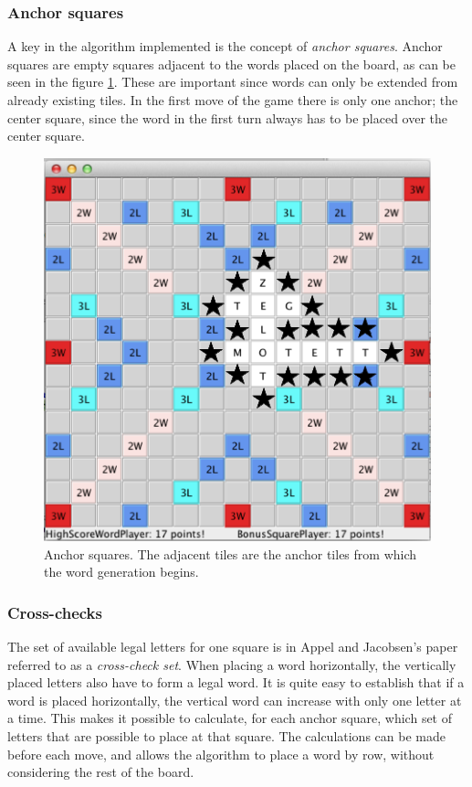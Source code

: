 \documentclass[a4paper, 12pt]{report}
\begin{document}
\subsubsection{Anchor squares}
\label{sec:anchors}
A key in the algorithm implemented is the concept of \emph{anchor squares}. Anchor squares are empty squares adjacent to the words placed on the board, as can be seen in the figure \ref{fig:anchors}. These are important since words can only be extended from already existing tiles. In the first move of the game there is only one anchor; the center square, since the word in the first turn always has to be placed over the center square.

\begin{figure}[h]
\centering
\includegraphics[scale=0.3]{anchors}
\caption{Anchor squares. The adjacent tiles are the anchor tiles from which the word generation begins.}
\label{fig:anchors}
\end{figure}

\subsubsection{Cross-checks}
\label{sec:crosscheck}
The set of available legal letters for one square is in Appel and Jacobsen's paper \cite{fastest} referred to as a \emph{cross-check set}. When placing a word horizontally, the vertically placed letters also have to form a legal word. It is quite easy to establish that if a word is placed horizontally, the vertical word can increase with only one letter at a time. This makes it possible to calculate, for each anchor square, which set of letters that are possible to place at that square. The calculations can be made before each move, and allows the algorithm to place a word by row, without considering the rest of the board. 
\end{document}
